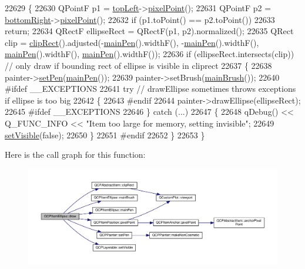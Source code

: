 \begin{DoxyCode}
22629 \{
22630   QPointF p1 = \hyperlink{class_q_c_p_item_ellipse_a12fd8420c06718d0c8a2303d6a652848}{topLeft}->\hyperlink{class_q_c_p_item_position_ae490f9c76ee2ba33752c495d3b6e8fb5}{pixelPoint}();
22631   QPointF p2 = \hyperlink{class_q_c_p_item_ellipse_ab73c8deafc0d8d1ef7d75b6cdcc37159}{bottomRight}->\hyperlink{class_q_c_p_item_position_ae490f9c76ee2ba33752c495d3b6e8fb5}{pixelPoint}();
22632   \textcolor{keywordflow}{if} (p1.toPoint() == p2.toPoint())
22633     \textcolor{keywordflow}{return};
22634   QRectF ellipseRect = QRectF(p1, p2).normalized();
22635   QRect clip = \hyperlink{class_q_c_p_abstract_item_a538e25ff8856534582f5b2b400a46405}{clipRect}().adjusted(-\hyperlink{class_q_c_p_item_ellipse_afc78d49ed5ffa886bccf18f297f83d30}{mainPen}().widthF(), -\hyperlink{class_q_c_p_item_ellipse_afc78d49ed5ffa886bccf18f297f83d30}{mainPen}().widthF(), 
      \hyperlink{class_q_c_p_item_ellipse_afc78d49ed5ffa886bccf18f297f83d30}{mainPen}().widthF(), \hyperlink{class_q_c_p_item_ellipse_afc78d49ed5ffa886bccf18f297f83d30}{mainPen}().widthF());
22636   \textcolor{keywordflow}{if} (ellipseRect.intersects(clip)) \textcolor{comment}{// only draw if bounding rect of ellipse is visible in cliprect}
22637   \{
22638     painter->\hyperlink{class_q_c_p_painter_af9c7a4cd1791403901f8c5b82a150195}{setPen}(\hyperlink{class_q_c_p_item_ellipse_afc78d49ed5ffa886bccf18f297f83d30}{mainPen}());
22639     painter->setBrush(\hyperlink{class_q_c_p_item_ellipse_a2a9757204877c9d0fd07adfb26d6b1d8}{mainBrush}());
22640 \textcolor{preprocessor}{#ifdef \_\_EXCEPTIONS}
22641     \textcolor{keywordflow}{try} \textcolor{comment}{// drawEllipse sometimes throws exceptions if ellipse is too big}
22642     \{
22643 \textcolor{preprocessor}{#endif}
22644       painter->drawEllipse(ellipseRect);
22645 \textcolor{preprocessor}{#ifdef \_\_EXCEPTIONS}
22646     \} \textcolor{keywordflow}{catch} (...)
22647     \{
22648       qDebug() << Q\_FUNC\_INFO << \textcolor{stringliteral}{"Item too large for memory, setting invisible"};
22649       \hyperlink{class_q_c_p_layerable_a3bed99ddc396b48ce3ebfdc0418744f8}{setVisible}(\textcolor{keyword}{false});
22650     \}
22651 \textcolor{preprocessor}{#endif}
22652   \}
22653 \}
\end{DoxyCode}


Here is the call graph for this function\+:\nopagebreak
\begin{figure}[H]
\begin{center}
\leavevmode
\includegraphics[width=350pt]{class_q_c_p_item_ellipse_afe97ec827adb05f000fe007783faae3c_cgraph}
\end{center}
\end{figure}


